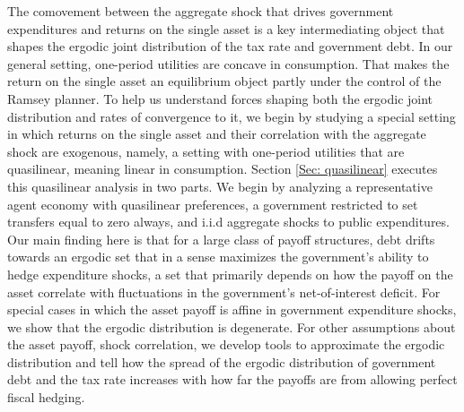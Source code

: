 \documentclass[thmsb,11pt]{article}
\begin{document}
The comovement between the aggregate shock that drives government expenditures and returns
on the single asset is a key intermediating object that shapes the ergodic joint distribution of the tax rate and government debt.  In our general setting, one-period utilities are concave in consumption. That makes  the return on the single asset an equilibrium object partly under the control of the Ramsey planner.
 To help us understand forces shaping both the ergodic joint distribution and rates of convergence to it,  we begin by
studying a special setting in which returns on the single asset and their correlation with the aggregate shock are exogenous, namely,
a setting with one-period utilities  that are quasilinear, meaning linear in consumption.
Section \ref{Sec: quasilinear} executes this quasilinear  analysis in two parts. We begin by analyzing
a representative agent economy with quasilinear preferences, a government restricted to set transfers equal to zero always, and i.i.d aggregate shocks to public expenditures.
  Our main finding here is  that for a large class of payoff structures,
debt  drifts towards an ergodic set that in a sense maximizes the  government's ability to hedge expenditure shocks,  a set
that  primarily depends on how the payoff on the asset  correlate with  fluctuations in the
 government's net-of-interest deficit. 
For special cases in which the asset payoff is affine in government expenditure shocks, we
show that the ergodic distribution is degenerate. For other assumptions about the asset payoff, shock correlation, we develop tools to approximate the ergodic distribution
 and tell  how the spread of the ergodic distribution of government  debt and the tax rate increases with how far the payoffs  are from allowing perfect fiscal hedging.
\end{document}
